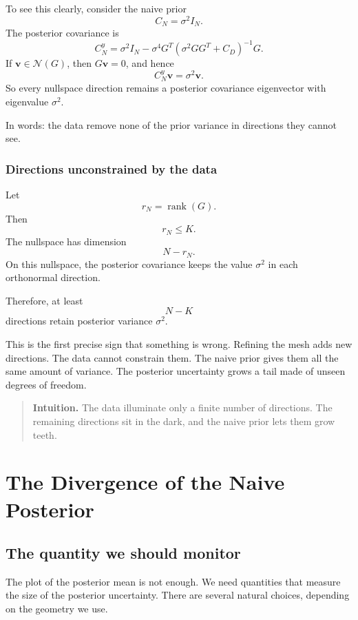 \documentclass[11pt,a4paper]{book}
\newenvironment{intuition}
  {\begin{quote}\textbf{Intuition.}}
  {\end{quote}}
\begin{document}
To see this clearly, consider the naive prior
\[
    C_N = \sigma^2 I_N.
\]
The posterior covariance is
\[
    C_N^y
    =
    \sigma^2 I_N
    -
    \sigma^4 G^T
    \left(
        \sigma^2 GG^T + C_D
    \right)^{-1}
    G.
\]
If $\bm{v}\in\mathcal{N}(G)$, then $G\bm{v}=0$, and hence
\[
    C_N^y\bm{v}
    =
    \sigma^2 \bm{v}.
\]
So every nullspace direction remains a posterior covariance eigenvector with
eigenvalue $\sigma^2$.

In words: the data remove none of the prior variance in directions they cannot
see.

\subsection{Directions unconstrained by the data}

Let
\[
    r_N = \operatorname{rank}(G).
\]
Then
\[
    r_N \leq K.
\]
The nullspace has dimension
\[
    N-r_N.
\]
On this nullspace, the posterior covariance keeps the value $\sigma^2$ in each
orthonormal direction.

Therefore, at least
\[
    N-K
\]
directions retain posterior variance $\sigma^2$.

This is the first precise sign that something is wrong. Refining the mesh adds
new directions. The data cannot constrain them. The naive prior gives them all
the same amount of variance. The posterior uncertainty grows a tail made of
unseen degrees of freedom.

\begin{intuition}
The data illuminate only a finite number of directions.
The remaining directions sit in the dark, and the naive prior lets them grow teeth.
\end{intuition}


\chapter{The Divergence of the Naive Posterior}

\section{The quantity we should monitor}

The plot of the posterior mean is not enough. We need quantities that measure
the size of the posterior uncertainty. There are several natural choices,
depending on the geometry we use.
\end{document}

